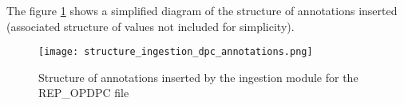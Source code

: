 The figure \ref{fg:structure_ingestion_dpc_annotations} shows a simplified diagram of the structure of annotations inserted (associated structure of values not included for simplicity).

\begin{figure}[H]
  \begin{center}
	\centering\texttt{[image: structure\_ingestion\_dpc\_annotations.png]}
	\caption{Structure of annotations inserted by the ingestion module for the REP\_OPDPC file}
	\label{fg:structure_ingestion_dpc_annotations}
  \end{center}
\end{figure}
